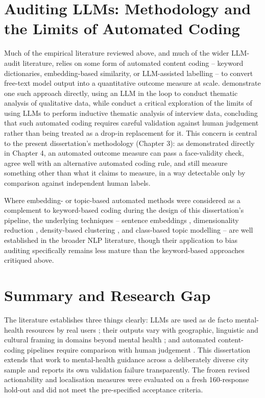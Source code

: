 \section{Auditing LLMs: Methodology and the Limits of Automated Coding}

Much of the empirical literature reviewed above, and much of the wider LLM-audit literature, relies on some form of automated content coding -- keyword dictionaries, embedding-based similarity, or LLM-assisted labelling -- to convert free-text model output into a quantitative outcome measure at scale. \citet{dai2023llm} demonstrate one such approach directly, using an LLM in the loop to conduct thematic analysis of qualitative data, while \citet{depaoli2024thematic} conduct a critical exploration of the limits of using LLMs to perform inductive thematic analysis of interview data, concluding that such automated coding requires careful validation against human judgement rather than being treated as a drop-in replacement for it. This concern is central to the present dissertation's methodology (Chapter 3): as demonstrated directly in Chapter 4, an automated outcome measure can pass a face-validity check, agree well with an alternative automated coding rule, and still measure something other than what it claims to measure, in a way detectable only by comparison against independent human labels.

Where embedding- or topic-based automated methods were considered as a complement to keyword-based coding during the design of this dissertation's pipeline, the underlying techniques -- sentence embeddings \citep{reimers2019sentencebert}, dimensionality reduction \citep{mcinnes2018umap}, density-based clustering \citep{campello2013density}, and class-based topic modelling \citep{grootendorst2022bertopic} -- are well established in the broader NLP literature, though their application to bias auditing specifically remains less mature than the keyword-based approaches critiqued above.

\section{Summary and Research Gap}

The literature establishes three things clearly: LLMs are used as de facto mental-health resources by real users \citep{rousmaniere2025mentalhealth, saha2025linguistic}; their outputs vary with geographic, linguistic and cultural framing in domains beyond mental health \citep{decoupes2025geographical, lyu2024regional, jin2024english}; and automated content-coding pipelines require comparison with human judgement \citep{dai2023llm, depaoli2024thematic}. This dissertation extends that work to mental-health guidance across a deliberately diverse city sample and reports its own validation failure transparently. The frozen revised actionability and localisation measures were evaluated on a fresh 160-response hold-out and did not meet the pre-specified acceptance criteria.
